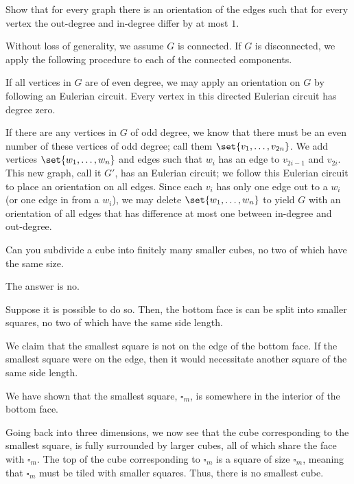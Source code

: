 \documentclass[10pt]{mypackage}
\begin{document}
\begin{problem}
Show that for every graph there is an orientation of the edges such that for every vertex the out-degree and in-degree differ by at most $1$.
\end{problem}
\begin{solution}
  Without loss of generality, we assume $G$ is connected. If $G$ is disconnected, we apply the following procedure to each of the connected components.\newline

  If all vertices in $G$ are of even degree, we may apply an orientation on $G$ by following an Eulerian circuit. Every vertex in this directed Eulerian circuit has degree zero.\newline

  If there are any vertices in $G$ of odd degree, we know that there must be an even number of these vertices of odd degree; call them $\set{v_1,\dots,v_{2n}}$. We add vertices $\set{w_1,\dots,w_n}$ and edges such that $w_i$ has an edge to $v_{2i-1}$ and $v_{2i}$. This new graph, call it $G'$, has an Eulerian circuit; we follow this Eulerian circuit to place an orientation on all edges. Since each $v_i$ has only one edge out to a $w_i$ (or one edge in from a $w_i$), we may delete $\set{w_1,\dots,w_n}$ to yield $G$ with an orientation of all edges that has difference at most one between in-degree and out-degree.
\end{solution}
\begin{problem}
Can you subdivide a cube into finitely many smaller cubes, no two of which have the same size.
\end{problem}
\begin{solution}
  The answer is no.\newline

  Suppose it is possible to do so. Then, the bottom face is can be split into smaller squares, no two of which have the same side length.\newline

  We claim that the smallest square is not on the edge of the bottom face. If the smallest square were on the edge, then it would necessitate another square of the same side length.\newline

  We have shown that the smallest square, $\square_m$, is somewhere in the interior of the bottom face.\newline

  Going back into three dimensions, we now see that the cube corresponding to the smallest square, is fully surrounded by larger cubes, all of which share the face with $\square_m$. The top of the cube corresponding to $\square_m$ is a square of size $\square_m$, meaning that $\square_m$ must be tiled with smaller squares. Thus, there is no smallest cube.
\end{solution}
\end{document}
